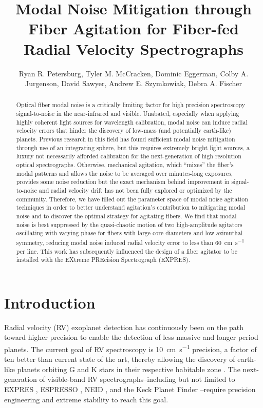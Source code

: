 \documentclass[twocolumn]{emulateapj}
\begin{document}
\title{Modal Noise Mitigation through Fiber Agitation for Fiber-fed Radial Velocity Spectrographs}

\author{Ryan R. Petersburg, Tyler M. McCracken, Dominic Eggerman, Colby A. Jurgenson, David Sawyer, Andrew E. Szymkowiak, Debra A. Fischer}

\begin{abstract}

Optical fiber modal noise is a critically limiting factor for high precision spectroscopy signal-to-noise in the near-infrared and visible. Unabated, especially when applying highly coherent light sources for wavelength calibration, modal noise can induce radial velocity errors that hinder the discovery of low-mass (and potentially earth-like) planets. Previous research in this field has found sufficient modal noise mitigation through use of an integrating sphere, but this requires extremely bright light sources, a luxury not necessarily afforded calibration for the next-generation of high resolution optical spectrographs. Otherwise, mechanical agitation, which ``mixes'' the fiber's modal patterns and allows the noise to be averaged over minutes-long exposures, provides some noise reduction but the exact mechanism behind improvement in signal-to-noise and radial velocity drift has not been fully explored or optimized by the community. Therefore, we have filled out the parameter space of modal noise agitation techniques in order to better understand agitation's contribution to mitigating modal noise and to discover the optimal strategy for agitating fibers. We find that modal noise is best suppressed by the quasi-chaotic motion of two high-amplitude agitators oscillating with varying phase for fibers with large core diameters and low azimuthal symmetry, reducing modal noise induced radial velocity error to less than \SI{60}{\centi\meter\per\second} per line. This work has subsequently influenced the design of a fiber agitator to be installed with the EXtreme PREcision Spectrograph (EXPRES).

\end{abstract}


\section{Introduction}
\label{sec:intro}

Radial velocity (RV) exoplanet detection has continuously been on the path toward higher precision to enable the detection of less massive and longer period planets. The current goal of RV spectroscopy is \SI{10}{\centi\meter\per\second} precision, a factor of ten better than current state of the art, thereby allowing the discovery of earth-like planets orbiting G and K stars in their respective habitable zone \citep{Fischer2016}. The next-generation of visible-band RV spectrographs--including but not limited to EXPRES \citep{Jurgenson2016}, ESPRESSO \citep{Megevand2012}, NEID \citep{Schwab2016}, and the Keck Planet Finder \citep{Gibson2016}--require precision engineering and extreme stability to reach this goal.
\end{document}
